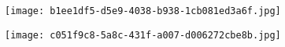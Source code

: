 \documentclass[a4paper, fontsize=10pt]{article}
\begin{document}
\begin{figure}[ht]
    \texttt{[image: b1ee1df5-d5e9-4038-b938-1cb081ed3a6f.jpg]}
\end{figure}
\begin{figure}[ht]
    \texttt{[image: c051f9c8-5a8c-431f-a007-d006272cbe8b.jpg]}
\end{figure}
\end{document}
